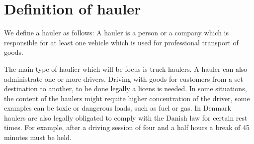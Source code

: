 \section{Definition of hauler}
We define a hauler as follows:
A hauler is a person or a company which is responsible for at least one vehicle which is used for professional transport of goods.

The main type of haulier which will be focus is truck haulers.
A hauler can also administrate one or more drivers.
Driving with goods for customers from a set destination to another, to be done legally a licens is needed.
In some situations, the content of the haulers might requite higher concentration of the driver, some examples can be toxic or dangerous loads, such as fuel or gas.
In Denmark haulers are also legally obligated to comply with the Danish law\cite{haulierSleepLaw} for certain rest times.
For example, after a driving session of four and a half hours a break of 45 minutes must be held.
